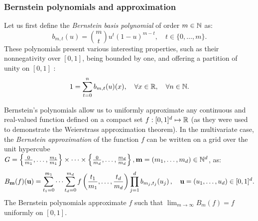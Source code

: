 \subsubsection{Bernstein polynomials and approximation}
Let us first define the \textit{Bernstein basis polynomial} of order $m \in \mathbb{N}$ as: 
\begin{equation}
    b_{m, t}(u)= \binom{m}{t}u^t(1-u)^{m-t}, \quad t \in \{0, \dots, m\}.
\end{equation}
These polynomials present various interesting properties, such as their nonnegativity over $[0, 1]$, being bounded by one, and offering a partition of unity on $[0, 1]$ \citep{lasserre_2023_bernstein}: 
\begin{equation}
    1 = \sum_{t=0}^{n} b_{m, t}(u)(x), \quad \forall x\in\mathbb{R}, \quad \forall n \in \mathbb{N}.
\end{equation} 

Bernstein's polynomials allow us to uniformly approximate any continuous and real-valued function defined on a compact set $f: [0, 1]^d \mapsto \mathbb{R}$ (as they were used to demonstrate the Weierstrass approximation theorem). 
In the multivariate case, the \textit{Bernstein approximation} of the function $f$ can be written on a grid over the unit hypercube $G=\left\{\frac{0}{m_1}, \dots, \frac{m_1}{m_1}\right\} \times \dots \times \left\{\frac{0}{m_d}, \dots, \frac{m_d}{m_d}\right\}, {\bf m} = (m_1, \dots, m_d) \in \mathbb{N}^d$, as: 
\begin{equation}
    B_{{\bf m}}(f)({\bf u}) = \sum_{t_1=0}^{m_1} \dots \sum_{t_d=0}^{m_d} f\left(\frac{t_1}{m_1}, \dots, \frac{t_d}{m_d}\right) \prod_{j=1}^d b_{m_j, t_j}(u_j) \, , \quad  {\bf u} = (u_1, \dots, u_d) \in [0, 1]^d.
    \label{eq:bernstein_approx}
\end{equation}
The Bernstein polynomials approximate $f$ such that $\lim_{m\to\infty} B_{m}(f) = f$ uniformly on $\left[0,1\right]$. 


